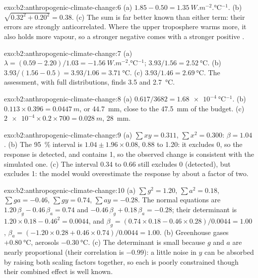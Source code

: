 \begin{solution}{exo:b2:anthropogenic-climate-change:6}
(a) $1.85 - 0.50 = \qty{1.35}{W.m^{-2}.\celsius^{-1}}$. (b) $\sqrt{0.32^2 + 0.20^2} = 0.38$.
(c) The sum is far better known than either term: their errors are strongly anticorrelated. Where
the upper troposphere warms more, it also holds more vapour, so a stronger negative  comes with a stronger positive .
\end{solution}

\begin{solution}{exo:b2:anthropogenic-climate-change:7}
(a) $\lambda = (0.59 - 2.20)/1.03 = \qty{-1.56}{W.m^{-2}.\celsius^{-1}}$; $3.93/1.56 =
\qty{2.52}{\celsius}$. (b) $3.93/(1.56 - 0.5) = 3.93/1.06 = \qty{3.71}{\celsius}$. (c) $3.93/1.46 =
\qty{2.69}{\celsius}$. The assessment, with full distributions, finds 3.5 and \qty{2.7}{\celsius}.
\end{solution}

\begin{solution}{exo:b2:anthropogenic-climate-change:8}
(a) $0.617/3682 = \qty{1.68e-4}{\celsius^{-1}}$. (b) $0.113 \times 0.396 = \qty{0.0447}{m}$, or
\qty{44.7}{mm}, close to the \qty{47.5}{mm} of the budget. (c) $\num{2e-4} \times 0.2 \times 700 =
\qty{0.028}{m}$, \qty{28}{mm}.
\end{solution}

\begin{solution}{exo:b2:anthropogenic-climate-change:9}
(a) $\sum xy = 0.311$, $\sum x^2 = 0.300$: $\beta = 1.04$. (b) The \qty{95}{\percent} interval is
$1.04 \pm 1.96 \times 0.08$, 0.88 to 1.20: it excludes 0, so the response is detected, and contains
1, so the observed change is consistent with the simulated one. (c) The interval 0.34 to 0.66 still
excludes 0 (detected), but excludes 1: the model would overestimate the response by about a factor
of two.
\end{solution}

\begin{solution}{exo:b2:anthropogenic-climate-change:10}
(a) $\sum g^2 = 1.20$, $\sum a^2 = 0.18$, $\sum ga = -0.46$, $\sum gy = 0.74$, $\sum ay = -0.28$.
The normal equations are $1.20\,\beta_g - 0.46\,\beta_a = 0.74$ and $-0.46\,\beta_g + 0.18\,\beta_a
= -0.28$; their determinant is $1.20 \times 0.18 - 0.46^2 = 0.0044$, and $\beta_g = (0.74 \times
0.18 - 0.46 \times 0.28)/0.0044 = 1.00$, $\beta_a = (-1.20 \times 0.28 + 0.46 \times 0.74)/0.0044 =
1.00$. (b) Greenhouse gases $+\qty{0.80}{\celsius}$, aerosols $-\qty{0.30}{\celsius}$. (c) The
determinant is small because $g$ and $a$ are nearly proportional (their correlation is $-0.99$): a
little noise in $y$ can be absorbed by raising both scaling factors together, so each is poorly
constrained though their combined effect is well known.
\end{solution}


